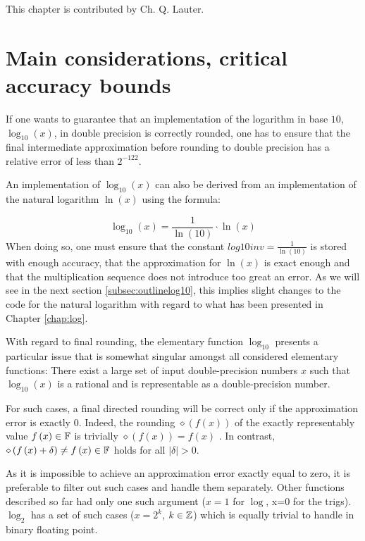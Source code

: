 This chapter is contributed by Ch. Q. Lauter.

\section{Main considerations, critical accuracy bounds}\label{subsec:criticalboundslog10}
If one wants to guarantee that an implementation of the logarithm in
base $10$, $\log_{10}\left( x \right)$, in double precision is
correctly rounded, one has to ensure that the final intermediate
approximation before rounding to double precision has a relative error
of less than $2^{-122}$.

An implementation of $\log_{10}\left(x\right)$ can also be derived from an
implementation of the natural logarithm $\ln\left(x\right)$ using the formula:

\begin{equation}
  \log_{10}\left( x \right) = \frac{1}{\ln\left( 10 \right)} \cdot
\ln\left( x \right)\label{eq:log10}
\end{equation}
When doing so, one must ensure that the constant
$\mathit{log10inv} = \frac{1}{\ln\left(10\right)}$ is stored with
enough accuracy, that the approximation for $\ln\left( x \right)$ is
exact enough and that the multiplication sequence does not introduce 
too great an error. As we will see in the next section
\ref{subsec:outlinelog10}, this implies slight changes to the code for
the natural logarithm with regard to what has been presented in
 Chapter \ref{chap:log}.

 With regard to final rounding, the elementary function $\log_{10}$
 presents a particular issue that is somewhat singular amongst all
 considered elementary functions: There exist a large set of input
 double-precision numbers $x$ such that $\log_{10}(x)$ is a rational
 and is representable as a double-precision number.

 For such cases, a final directed rounding will be correct only if the
 approximation error is exactly $0$. 
 Indeed, the rounding $\diamond\left( f\left( x \right) \right)$ of
 the exactly representably value $f\left(x\right) \in \mathbb {F}$ is trivially
 $\diamond\left( f\left( x \right) \right) = f\left( x \right)$
 \cite{IEEE754}. In contrast, $\diamond\left( f\left( x \right) +
   \delta \right) \not = f\left( x \right) \in \mathbb {F}$ holds for all
 $\left \vert \delta \right \vert > 0$. 

 As it is impossible to achieve an approximation error exactly equal
 to zero, it is preferable to filter out such cases and handle them
 separately. Other functions described so far had only one such argument
 ($x=1$ for $\log$, x=0 for the trigs). $\log_2$ has a set of such
 cases ($x = 2^k$, $k \in \mathbb {Z}$) which is equally trivial to handle in
 binary floating point.
 

